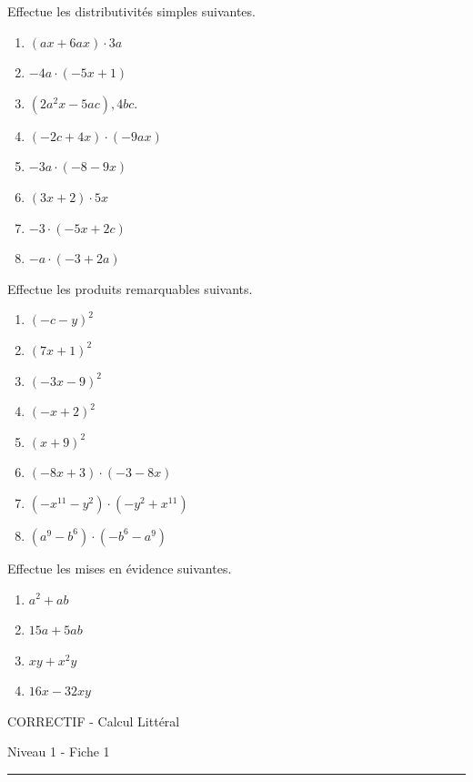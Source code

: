\documentclass[12pt,parskip=half-, twoside=semi]{scrartcl}
\begin{document}
\begin{exercise} Effectue les distributivités simples suivantes.
  \begin{enumerate}[cols=2]
    \item $(a x+6 a x) \cdot 3 a$
    \item $-4 a \cdot(-5 x+1)$
    \item $\left(2 a^2 x-5 a c\right), 4 b c$.
    \item $(-2 c+4 x) \cdot(-9 a x)$
    \item $-3 a \cdot(-8-9 x)$
    \item $(3 x+2) \cdot 5 x$
    \item $-3 \cdot(-5 x+2 c)$
    \item $-a \cdot(-3+2 a)$
  \end{enumerate}
\end{exercise}

\begin{exercise} Effectue les produits remarquables suivants.
  \begin{enumerate}[cols=2]
    \item $(-c-y)^2$
    \item $(7 x+1)^2$
    \item $(-3 x-9)^2$
    \item $(-x+2)^2$
    \item $(x+9)^2$
    \item $(-8 x+3) \cdot(-3-8 x)$
    \item $\left(-x^{11}-y^2\right) \cdot\left(-y^2+x^{11}\right)$
    \item $\left(a^9-b^6\right) \cdot\left(-b^6-a^9\right)$
  \end{enumerate}
\end{exercise}

\begin{exercise} Effectue les mises en évidence suivantes.
  \begin{enumerate}[cols=2]
    \item $a^2+a b$
    \item $15 a+5 a b$
    \item $x y+x^2 y$
    \item $16 x-32 x y$
  \end{enumerate}
\end{exercise}



\begin{center}
  \bfseries
  \begin{Huge}
    CORRECTIF - Calcul Littéral
  \end{Huge}
  \smallbreak
  \begin{large}
    Niveau 1  - Fiche 1
  \end{large}
  \smallbreak
  \rule[10pt]{.5\linewidth}{1 pt}
\end{center}
\end{document}
